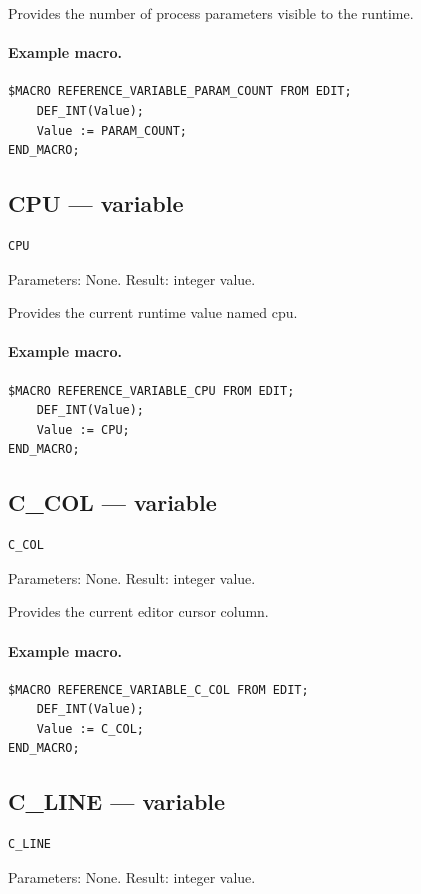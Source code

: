 \documentclass[a4paper,10pt,twoside,openany]{book}
\begin{document}
Provides the number of process parameters visible to the runtime.

\paragraph{Example macro.}
\begin{verbatim}
$MACRO REFERENCE_VARIABLE_PARAM_COUNT FROM EDIT;
    DEF_INT(Value);
    Value := PARAM_COUNT;
END_MACRO;
\end{verbatim}

\label{prim:variable-cpu}
\subsection*{CPU --- variable}
\begin{verbatim}
CPU
\end{verbatim}
Parameters: None. Result: integer value.

Provides the current runtime value named cpu.

\paragraph{Example macro.}
\begin{verbatim}
$MACRO REFERENCE_VARIABLE_CPU FROM EDIT;
    DEF_INT(Value);
    Value := CPU;
END_MACRO;
\end{verbatim}

\label{prim:variable-c-col}
\subsection*{C\_COL --- variable}
\begin{verbatim}
C_COL
\end{verbatim}
Parameters: None. Result: integer value.

Provides the current editor cursor column.

\paragraph{Example macro.}
\begin{verbatim}
$MACRO REFERENCE_VARIABLE_C_COL FROM EDIT;
    DEF_INT(Value);
    Value := C_COL;
END_MACRO;
\end{verbatim}

\label{prim:variable-c-line}
\subsection*{C\_LINE --- variable}
\begin{verbatim}
C_LINE
\end{verbatim}
Parameters: None. Result: integer value.
\end{document}
